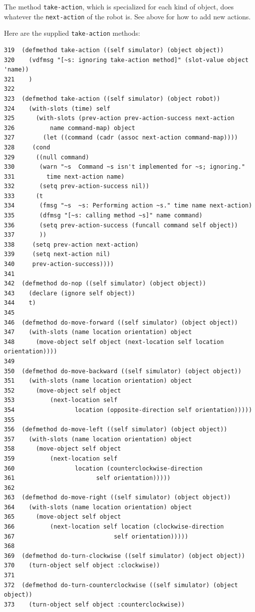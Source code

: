 \documentclass[11pt]{tufte-handout}
\begin{document}
\begin{enumerate}
The method \texttt{take-action}, which is specialized for each kind of object, does whatever the \texttt{next-action} of the robot is.  See above for how to add new actions.

Here are the supplied \texttt{take-action} methods:

\begin{verbatim}
319  (defmethod take-action ((self simulator) (object object))
320    (vdfmsg "[~s: ignoring take-action method]" (slot-value object 'name))
321    )
322  
323  (defmethod take-action ((self simulator) (object robot))
324    (with-slots (time) self
325      (with-slots (prev-action prev-action-success next-action
326  		 name command-map) object
327        (let ((command (cadr (assoc next-action command-map))))
328  	(cond
329  	 ((null command)
330  	  (warn "~s  Command ~s isn't implemented for ~s; ignoring." 
331  		time next-action name)
332  	  (setq prev-action-success nil))
333  	 (t
334  	  (fmsg "~s  ~s: Performing action ~s." time name next-action)
335  	  (dfmsg "[~s: calling method ~s]" name command)
336  	  (setq prev-action-success (funcall command self object))
337  	  ))
338  	(setq prev-action next-action)
339  	(setq next-action nil)
340  	prev-action-success))))
341  
342  (defmethod do-nop ((self simulator) (object object))
343    (declare (ignore self object))
344    t)
345  
346  (defmethod do-move-forward ((self simulator) (object object))
347    (with-slots (name location orientation) object
348      (move-object self object (next-location self location orientation))))
349  
350  (defmethod do-move-backward ((self simulator) (object object))
351    (with-slots (name location orientation) object
352      (move-object self object
353  		 (next-location self
354  				location (opposite-direction self orientation)))))
355  
356  (defmethod do-move-left ((self simulator) (object object))
357    (with-slots (name location orientation) object
358      (move-object self object
359  		 (next-location self
360  				location (counterclockwise-direction
361  					  self orientation)))))
362  
363  (defmethod do-move-right ((self simulator) (object object))
364    (with-slots (name location orientation) object
365      (move-object self object
366  		 (next-location self location (clockwise-direction
367  					       self orientation)))))
368  
369  (defmethod do-turn-clockwise ((self simulator) (object object))
370    (turn-object self object :clockwise))
371  
372  (defmethod do-turn-counterclockwise ((self simulator) (object object))
373    (turn-object self object :counterclockwise))

\end{verbatim}
\end{enumerate}
\end{document}
